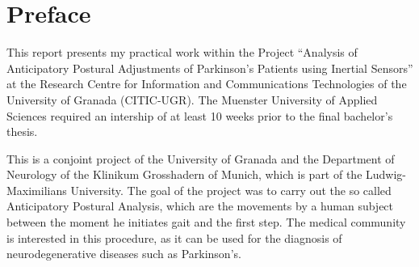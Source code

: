 \chapter*{Preface}

This report presents my practical work within the Project ``Analysis of Anticipatory Postural Adjustments of Parkinson's Patients using Inertial Sensors'' at the Research Centre for Information and Communications Technologies of the University of Granada (CITIC-UGR). The Muenster University of Applied Sciences required an intership of at least 10 weeks prior to the final bachelor's thesis.

This is a conjoint project of the University of Granada and the Department of Neurology of the Klinikum Grosshadern of Munich, which is part of the Ludwig-Maximilians University. The goal of the project was to carry out the so called Anticipatory Postural Analysis, which are the movements by a human subject between the moment he initiates gait and the first step. The medical community is interested in this procedure, as it can be used for the diagnosis of neurodegenerative diseases such as Parkinson's.